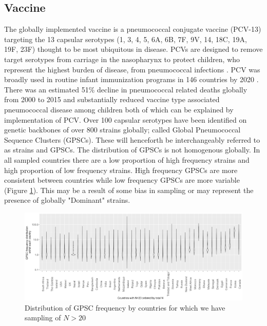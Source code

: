 \documentclass{article}
\begin{document}
\subsection{Vaccine} 
The globally implemented vaccine is a pneumococcal conjugate vaccine (PCV-13) targeting the 13 capsular serotypes (1, 3, 4, 5, 6A, 6B, 7F, 9V, 14, 18C, 19A, 19F, 23F) thought to be most ubiquitous in disease\cite{VaccineInformationStatement2019}. PCVs are designed to remove target serotypes from carriage in the nasopharynx to protect children, who represent the highest burden of disease, from pneumococcal infections \cite{bogaertStreptococcusPneumoniaeColonisation2004,wyllieMolecularSurveillanceStreptococcus2016}. PCV was broadly used in routine infant immunization programs in 146 countries by 2020 \cite{VaccineInformationStatement2019}. There was an estimated 51\% decline in pneumococcal related deaths globally from 2000 to 2015 and substantially reduced vaccine type associated pneumococcal disease among children both of which can be explained by implementation of PCV\cite{wahlBurdenStreptococcusPneumoniae2018, pilishviliSustainedReductionsInvasive2010,vongottbergEffectsVaccinationInvasive2014}. Over 100 capsular serotypes have been identified on genetic backbones of over 800 strains globally; called Global Pneumococcal Sequence Clusters (GPSCs)\cite{gladstoneInternationalGenomicDefinition2019b}. These will henceforth be interchangeably referred to as strains and GPSCs. The distribution of  GPSCs is not homogenous globally. In all sampled countries there are a low proportion of high frequency strains and high proportion of low frequency strains. High frequency GPSCs are more consistent between countries while low frequency GPSCs are more variable (Figure \ref{fig:gpscfreqdist}). This may be a result of some bias in sampling or may represent the presence of globally "Dominant" strains\cite{gladstoneInternationalGenomicDefinition2019b}.  
\begin{figure}
    \centering
    \includegraphics[width=\textwidth]{08MAR21_gpscfreqDistribution.png}
    \caption{Distribution of GPSC frequency by countries for which we have sampling of $N>20$}
    \label{fig:gpscfreqdist}
\end{figure} 
\end{document}

